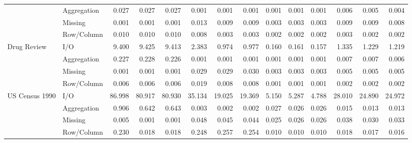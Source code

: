 \begin{tabular}{llrrrrrrrrrrrr}
 & Aggregation & 0.027 & 0.027 & 0.027 & 0.001 & 0.001 & 0.001 & 0.001 & 0.001 & 0.001 & 0.006 & 0.005 & 0.004 \\
 & Missing & 0.001 & 0.001 & 0.001 & 0.013 & 0.009 & 0.009 & 0.003 & 0.003 & 0.003 & 0.009 & 0.009 & 0.008 \\
 & Row/Column & 0.010 & 0.010 & 0.010 & 0.008 & 0.003 & 0.003 & 0.002 & 0.002 & 0.002 & 0.003 & 0.002 & 0.002 \\
\cline{1-14}
\multirow[t]{4}{*}{Drug Review} & I/O & 9.400 & 9.425 & 9.413 & 2.383 & 0.974 & 0.977 & 0.160 & 0.161 & 0.157 & 1.335 & 1.229 & 1.219 \\
 & Aggregation & 0.227 & 0.228 & 0.226 & 0.001 & 0.001 & 0.001 & 0.001 & 0.001 & 0.001 & 0.007 & 0.007 & 0.006 \\
 & Missing & 0.001 & 0.001 & 0.001 & 0.029 & 0.029 & 0.030 & 0.003 & 0.003 & 0.003 & 0.005 & 0.005 & 0.005 \\
 & Row/Column & 0.006 & 0.006 & 0.006 & 0.019 & 0.008 & 0.008 & 0.001 & 0.001 & 0.001 & 0.002 & 0.002 & 0.002 \\
\cline{1-14}
\multirow[t]{4}{*}{US Census 1990} & I/O & 86.998 & 80.917 & 80.930 & 35.134 & 19.025 & 19.369 & 5.150 & 5.287 & 4.788 & 28.010 & 24.890 & 24.972 \\
 & Aggregation & 0.906 & 0.642 & 0.643 & 0.003 & 0.002 & 0.002 & 0.027 & 0.026 & 0.026 & 0.015 & 0.013 & 0.013 \\
 & Missing & 0.005 & 0.001 & 0.001 & 0.048 & 0.045 & 0.044 & 0.025 & 0.026 & 0.026 & 0.038 & 0.030 & 0.033 \\
 & Row/Column & 0.230 & 0.018 & 0.018 & 0.248 & 0.257 & 0.254 & 0.010 & 0.010 & 0.010 & 0.018 & 0.017 & 0.016 \\
\cline{1-14}
\bottomrule
\end{tabular}
